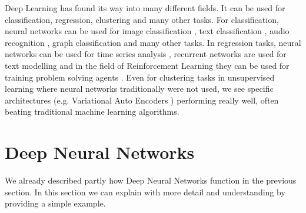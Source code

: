 \documentclass[b5paper]{book}
\let\cite\parencite
\begin{document}
Deep Learning has found its way into many different fields. It can be used for classification, regression, clustering and many other tasks. For classification, neural networks can be used for image classification \cite{krizhevsky2012imagenet}, text classification \cite{joulin2016bag}, audio recognition \cite{lee2009unsupervised}, graph classification \cite{zhou2018graph} and many other tasks. In regression tasks, neural networks can be used for time series analysis \cite{fawaz2019deep}, recurrent networks are used for text modelling \cite{zhang2018deep} and in the field of Reinforcement Learning they can be used for training problem solving agents \cite{mnih2013playing}. Even for clustering tasks in unsupervised learning where neural networks traditionally were not used, we see specific architectures (e.g. Variational Auto Encoders \cite{goodfellow2016deep}) performing really well, often beating traditional machine learning algorithms.

\section{Deep Neural Networks}

We already described partly how Deep Neural Networks function in the previous section. In this section we can explain with more detail and understanding by providing a simple example.
\end{document}
